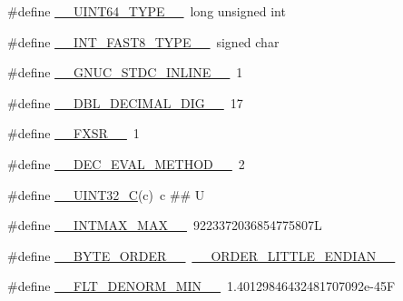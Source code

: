 \begin{DoxyCompactItemize}
\item 
\#define \hyperlink{build-analizer__host-_desktop___qt__5__9__0___g_c_c__64bit-_release_2moc__predefs_8h_aef86f5642c3dce887635c9fc632baf34}{\+\_\+\+\_\+\+U\+I\+N\+T64\+\_\+\+T\+Y\+P\+E\+\_\+\+\_\+}~long unsigned int
\item 
\#define \hyperlink{build-analizer__host-_desktop___qt__5__9__0___g_c_c__64bit-_release_2moc__predefs_8h_a3783fd947621ab5304708e78da5bd6d3}{\+\_\+\+\_\+\+I\+N\+T\+\_\+\+F\+A\+S\+T8\+\_\+\+T\+Y\+P\+E\+\_\+\+\_\+}~signed char
\item 
\#define \hyperlink{build-analizer__host-_desktop___qt__5__9__0___g_c_c__64bit-_release_2moc__predefs_8h_ad22737f11009b4bf60ba233eee7420dd}{\+\_\+\+\_\+\+G\+N\+U\+C\+\_\+\+S\+T\+D\+C\+\_\+\+I\+N\+L\+I\+N\+E\+\_\+\+\_\+}~1
\item 
\#define \hyperlink{build-analizer__host-_desktop___qt__5__9__0___g_c_c__64bit-_release_2moc__predefs_8h_a6b5dca178c4ffe879cd624f9b17b9bd1}{\+\_\+\+\_\+\+D\+B\+L\+\_\+\+D\+E\+C\+I\+M\+A\+L\+\_\+\+D\+I\+G\+\_\+\+\_\+}~17
\item 
\#define \hyperlink{build-analizer__host-_desktop___qt__5__9__0___g_c_c__64bit-_release_2moc__predefs_8h_a8d670e1ec8588185f0fb26433dc12ea1}{\+\_\+\+\_\+\+F\+X\+S\+R\+\_\+\+\_\+}~1
\item 
\#define \hyperlink{build-analizer__host-_desktop___qt__5__9__0___g_c_c__64bit-_release_2moc__predefs_8h_a53186c3d05006947fb8bd09bcdb0d60c}{\+\_\+\+\_\+\+D\+E\+C\+\_\+\+E\+V\+A\+L\+\_\+\+M\+E\+T\+H\+O\+D\+\_\+\+\_\+}~2
\item 
\#define \hyperlink{build-analizer__host-_desktop___qt__5__9__0___g_c_c__64bit-_release_2moc__predefs_8h_a8cc5a4a43af8f7568a450cad0e7d5bd8}{\+\_\+\+\_\+\+U\+I\+N\+T32\+\_\+\+C}(c)~c \#\# U
\item 
\#define \hyperlink{build-analizer__host-_desktop___qt__5__9__0___g_c_c__64bit-_release_2moc__predefs_8h_a6977858c9aa6bb2c67f524a948fc8062}{\+\_\+\+\_\+\+I\+N\+T\+M\+A\+X\+\_\+\+M\+A\+X\+\_\+\+\_\+}~9223372036854775807\+L
\item 
\#define \hyperlink{build-analizer__host-_desktop___qt__5__9__0___g_c_c__64bit-_release_2moc__predefs_8h_a02481ce2087724d8a2fb2322dbc549da}{\+\_\+\+\_\+\+B\+Y\+T\+E\+\_\+\+O\+R\+D\+E\+R\+\_\+\+\_\+}~\hyperlink{build-analizer__host-_desktop___qt__5__9__0___g_c_c__64bit-_release_2moc__predefs_8h_a2b695357ce4b46971d54e8e9dfe5724f}{\+\_\+\+\_\+\+O\+R\+D\+E\+R\+\_\+\+L\+I\+T\+T\+L\+E\+\_\+\+E\+N\+D\+I\+A\+N\+\_\+\+\_\+}
\item 
\#define \hyperlink{build-analizer__host-_desktop___qt__5__9__0___g_c_c__64bit-_release_2moc__predefs_8h_a20b8951342fd8b8af91e2bc9b34eb929}{\+\_\+\+\_\+\+F\+L\+T\+\_\+\+D\+E\+N\+O\+R\+M\+\_\+\+M\+I\+N\+\_\+\+\_\+}~1.\+40129846432481707092e-\/45\+F

\end{DoxyCompactItemize}
